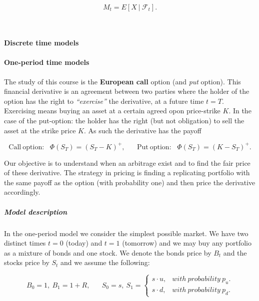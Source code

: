 \documentclass[
]{article}
\begin{document}
\[M_t=E[X\ \vert\ \mathcal{F}_t].\]

~

\hypertarget{discrete-time-models}{%
\paragraph{Discrete time models}\label{discrete-time-models}}

\hypertarget{one-period-time-models}{%
\paragraph{One-period time models}\label{one-period-time-models}}

The study of this course is the \textbf{European call} option (and
\emph{put} option). This financial derivative is an agreement between
two parties where the holder of the option has the right to
\emph{``exercise''} the derivative, at a future time \(t=T\). Exercising
means buying an asset at a certain agreed opon price-strike \(K\). In
the case of the put-option: the holder has the right (but not
obligation) to sell the asset at the strike price \(K\). As such the
derivative has the payoff

\[\text{Call}\ \text{option:}\hspace{10pt}\Phi(S_T)=(S_T-K)^+,\hspace{20pt}\text{Put}\ \text{option:}\hspace{10pt}\Phi(S_T)=(K-S_T)^+.\]

Our objective is to understand when an arbitrage exist and to find the
fair price of these derivative. The strategy in pricing is finding a
replicating portfolio with the same payoff as the option (with
probability one) and then price the derivative accordingly.

\hypertarget{model-description}{%
\subparagraph{Model description}\label{model-description}}

In the one-period model we consider the simplest possible market. We
have two distinct times \(t=0\) (today) and \(t=1\) (tomorrow) and we
may buy any portfolio as a mixture of bonds and one stock. We denote the
bonds price by \(B_t\) and the stocks price by \(S_t\) and we assume the
following:

\[
B_0=1,\ B_1=1+R,\hspace{20pt}S_0=s,\ S_1=\left\{\begin{matrix}s\cdot u, & with\ probability\ p_u.\\s\cdot d, & with\ probability\ p_d.\end{matrix}\right.
\]
\end{document}
